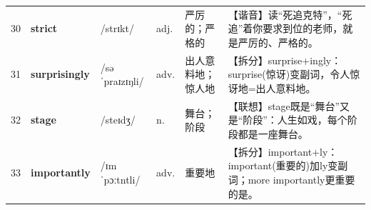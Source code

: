 \documentclass[UTF8,a4paper,11pt,oneside]{ctexbook}
\newcommand{\cellword}[1]{{\bfseries\textcolor{wordcol}{#1}}}
\newcommand{\cellipa}[1]{{\footnotesize\textcolor{ipacol}{#1}}}
\newcommand{\cellpos}[1]{\textcolor{poscol}{#1}}
\newcommand{\cellno}[1]{\textcolor{volcolor!75!black}{#1}}
\begin{document}
{\begin{longtable}{@{}C{0.045\textwidth}L{0.155\textwidth}L{0.175\textwidth}C{0.070\textwidth}L{0.180\textwidth}L{0.282\textwidth}@{}}
\cellno{30} & \cellword{strict} & \cellipa{/strɪkt/} & \cellpos{adj.} & 严厉的；严格的 & \textcolor{tagSound}{【谐音】}读“死追克特”，“死追”着你要求到位的老师，就是严厉的、严格的。 \\
 \cellno{31} & \cellword{surprisingly} & \cellipa{/səˈpraɪzɪŋli/} & \cellpos{adv.} & 出人意料地；惊人地 & \textcolor{tagSplit}{【拆分】}surprise+ingly：surprise(惊讶)变副词，令人惊讶地=出人意料地。 \\
\cellno{32} & \cellword{stage} & \cellipa{/steɪdʒ/} & \cellpos{n.} & 舞台；阶段 & \textcolor{tagAssoc}{【联想】}stage既是“舞台”又是“阶段”：人生如戏，每个阶段都是一座舞台。 \\
 \cellno{33} & \cellword{importantly} & \cellipa{/ɪmˈpɔːtntli/} & \cellpos{adv.} & 重要地 & \textcolor{tagSplit}{【拆分】}important+ly：important(重要的)加ly变副词；more importantly更重要的是。 \\
\end{longtable}
}

\end{document}
